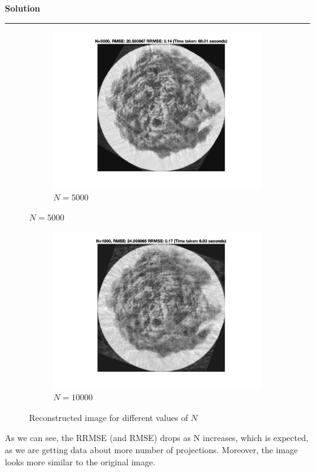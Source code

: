\documentclass[a4paper,12pt]{article}
\newenvironment{solution}[2][]{%
    \begin{mdframed}[linecolor=blue!70!black, linewidth=2pt, roundcorner=10pt, backgroundcolor=yellow!10!white, skipabove=12pt, skipbelow=12pt]%
        \textbf{\large #2}
        \par\noindent\rule{\textwidth}{0.4pt}
}{
    \end{mdframed}
}
\begin{document}
\begin{solution}{Solution}
\begin{figure}[H]
\begin{subfigure}[t]{0.32\textwidth}
        \includegraphics[width=\textwidth]{../images/reconstructed_N5000.png}
        \caption*{$N = 5000$}
    \end{subfigure}
    \label{fig:recons2}
  \end{figure}

  \begin{figure}[H]
    \centering
    \begin{subfigure}[t]{0.32\textwidth}
        \centering
        \includegraphics[width=\textwidth]{../images/reconstructed_N1000.png}
        \caption*{$N = 10000$}
    \end{subfigure}
    \caption*{Reconstructed image for different values of $N$}
    \label{fig:recons3}
  \end{figure}

  As we can see, the RRMSE (and RMSE) drops as N increases, which is expected, as we are getting data about more number of projections. Moreover, the image looks more similar to the original image. 

\end{solution}
\end{document}
